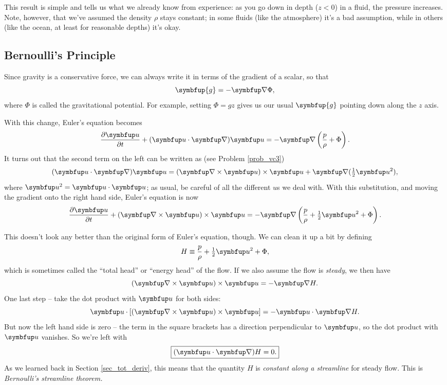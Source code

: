 This result is simple and tells us what we already know from experience:  as you go down in depth ($z < 0$) in a fluid, the pressure increases.  Note, however, that we've assumed the density $\rho$ stays constant; in some fluids (like the atmosphere) it's a bad assumption, while in others (like the ocean, at least for reasonable depths) it's okay.




\subsection{Bernoulli's Principle}

Since gravity is a conservative force, we can always write it in terms of the gradient of a scalar, so that
\[
\symbfup{g} = - \grad \Phi,
\]
where $\Phi$ is called the gravitational potential.  For example, setting $\Phi = gz$ gives us our usual $\symbfup{g}$ pointing down along the $z$ axis.

With this change, Euler's equation becomes
\begin{equation}
\frac{\partial \uu}{\partial t} + (\uu \cdot \grad) \uu = -\grad \left( \frac{p}{\rho} + \Phi \right).
\label{eq_euler_bern}
\end{equation}
It turns out that the second term on the left can be written as (see Problem \ref{prob_vc3})
\begin{equation}
 (\uu \cdot \grad) \uu = (\curl \uu ) \times \uu + \grad (\tfrac{1}{2} \uu^2),
\end{equation}
where $\uu^2 = \uu \cdot \uu$; as usual, be careful of all the different $u$s we deal with.  With this substitution, and moving the gradient onto the right hand side, Euler's equation is now
\begin{equation}
\frac{\partial \uu}{\partial t} + (\curl \uu ) \times \uu = -\grad \left( \frac{p}{\rho} + \tfrac{1}{2} \uu^2 + \Phi \right).
\end{equation}

This doesn't look any better than the original form of Euler's equation, though.  We can clean it up a bit by defining
\[
H \equiv \frac{p}{\rho} + \tfrac{1}{2} \uu^2 + \Phi,
\]
which is sometimes called the ``total head'' or ``energy head'' of the flow.  If we also assume the flow is \emph{steady}, we then have
\begin{equation}
(\curl \uu ) \times \uu = -\grad H.
\label{eq_bernoulli}
\end{equation}
One last step -- take the dot product with $\uu$ for both sides:
\[
\uu \cdot [(\curl \uu ) \times \uu] = -\uu \cdot \grad H.
\]
But now the left hand side is zero -- the term in the square brackets has a direction perpendicular to $\uu$, so the dot product with $\uu$ vanishes.  So we're left with
\begin{equation}
\boxed{
(\uu \cdot \grad) H  = 0.
}
\end{equation}
As we learned back in Section \ref{sec_tot_deriv}, this means that the quantity $H$ is \emph{constant along a streamline} for steady flow.  This is \emph{Bernoulli's streamline theorem.}

